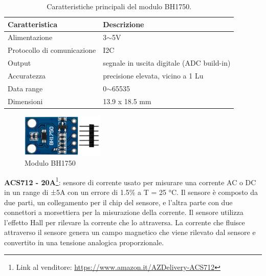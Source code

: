 \begin{table}[H]
    \centering
    \begin{tabular}{|l|l|}
    \hline
    \textbf{Caratteristica}     & \textbf{Descrizione}                      \\ \hline    Alimentazione               & 3$\sim$5V                                 \\ \hline
    Protocollo di comunicazione & I2C                                       \\ \hline
    Output                      & segnale in uscita digitale (ADC build-in) \\ \hline
    Accuratezza                 & precisione elevata, vicino a 1 Lu         \\ \hline
    Data range                  & 0$\sim$65535                              \\ \hline
    Dimensioni                  & 13.9 x 18.5 mm                           \\ \hline
    \end{tabular}
    \caption{\label{bh1750-features}Caratteristiche principali del modulo BH1750.}
\end{table}
%
\begin{figure}[H]
    \begin{center}
      \includegraphics[width=0.35\textwidth]{images/sensors/bh1750.png}
    \end{center}
    \caption{Modulo BH1750}
\end{figure}
%
\textbf{ACS712 - 20A}\footnote{Link al venditore: \href{https://www.amazon.it/AZDelivery-corrente-sensore-Current-Raspberry/dp/B0736DYV3W?th=1}{https://www.amazon.it/AZDelivery-ACS712}}: sensore di corrente usato per misurare una corrente AC o DC in un range di ±5A con un errore di 1.5\% a T = 25 °C. Il sensore è composto da due parti, un collegamento per il chip del sensore, e l'altra parte con due connettori a morsettiera per la misurazione della corrente.
Il sensore utilizza l'effetto Hall per rilevare la corrente che lo attraversa. La corrente che fluisce attraverso il sensore genera un campo magnetico che viene rilevato dal sensore e convertito in una tensione analogica proporzionale.

